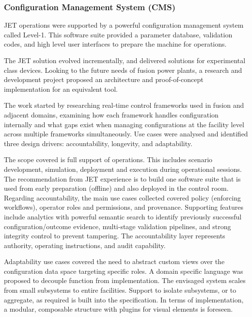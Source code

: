 \documentclass[preprint]{elsarticle}
\begin{document}
\subsubsection{Configuration Management System (CMS)}

JET operations were supported by a powerful configuration management system called Level-1.
This software suite provided a parameter database, validation codes, and high level 
user interfaces to prepare the machine for operations.

The JET solution evolved incrementally, and delivered solutions for experimental class devices.
Looking to the future needs of fusion power plants, a research and development project
proposed an architecture and proof-of-concept implementation for an equivalent tool.

The work started by researching real-time control frameworks used in fusion and adjacent domains, examining how each framework handles configuration internally and what gaps exist when managing configurations at the facility level across multiple frameworks simultaneously.
Use cases were analysed and identified three design drivers: accountability, longevity, and adaptability.

The scope covered is full support of operations.  This includes scenario development, simulation, deployment and execution during 
operational sessions.  The recommendation from JET experience is to build one software suite that is used from early preparation (offline)
 and also deployed in the control room. Regarding accountability, the main 
use cases collected covered policy (enforcing workflows), operator roles and permissions, and provenance.
Supporting features include analytics with powerful semantic search to identify previously successful
configuration/outcome evidence, multi-stage validation pipelines, and strong integrity control to 
prevent tampering.  The accountability layer represents authority, operating instructions, and audit capability.

Adaptability use cases covered the need to abstract custom views over the configuration data space
targeting specific roles.  A domain specific language was proposed to decouple function from implementation.
The envisaged system scales from small subsystems to entire facilities.  Support to isolate subsystems, or to 
aggregate, as required is built into the specification.  In terms of implementation, a modular, composable structure
with plugins for visual elements is foreseen.
\end{document}

